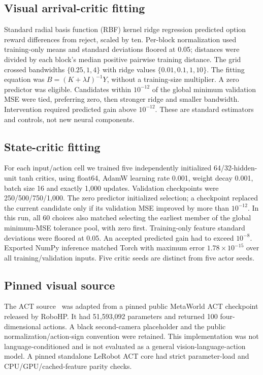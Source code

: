 \subsection{Visual arrival-critic fitting}
Standard radial basis function (RBF) kernel ridge regression predicted option reward differences from reject, scaled by ten. Per-block normalization used training-only means and standard deviations floored at 0.05; distances were divided by each block's median positive pairwise training distance. The grid crossed bandwidths $\{0.25,1,4\}$ with ridge values $\{0.01,0.1,1,10\}$. The fitting equation was $B=(K+\lambda I)^{-1}Y$, without a training-size multiplier. A zero predictor was eligible. Candidates within $10^{-12}$ of the global minimum validation MSE were tied, preferring zero, then stronger ridge and smaller bandwidth. Intervention required predicted gain above $10^{-12}$. These are standard estimators and controls, not new neural components.

\subsection{State-critic fitting}
For each input/action cell we trained five independently initialized 64/32-hidden-unit tanh critics, using float64, AdamW learning rate 0.001, weight decay 0.001, batch size 16 and exactly 1,000 updates. Validation checkpoints were 250/500/750/1,000. The zero predictor initialized selection; a checkpoint replaced the current candidate only if its validation MSE improved by more than $10^{-12}$. In this run, all 60 choices also matched selecting the earliest member of the global minimum-MSE tolerance pool, with zero first. Training-only feature standard deviations were floored at 0.05. An accepted predicted gain had to exceed $10^{-8}$. Exported NumPy inference matched Torch with maximum error $1.78\times10^{-15}$ over all training/validation inputs. Five critic seeds are distinct from five actor seeds.

\subsection{Pinned visual source}
The ACT source~\cite{act} was adapted from a pinned public MetaWorld ACT checkpoint released by RoboHP. It had 51,593,092 parameters and returned 100 four-dimensional actions. A black second-camera placeholder and the public normalization/action-sign convention were retained. This implementation was not language-conditioned and is not evaluated as a general vision-language-action model. A pinned standalone LeRobot ACT core had strict parameter-load and CPU/GPU/cached-feature parity checks.




